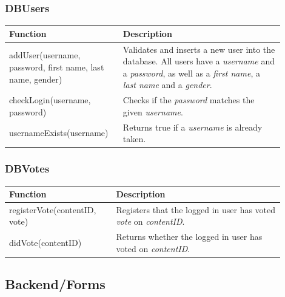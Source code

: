 \subsubsection{DBUsers}
\begin{minipage}{\linewidth}
  \centering
  \setlength{\tabcolsep}{12pt}
  \begin{tabular}{|p{0.35\linewidth}|p{0.55\linewidth}|}
  \hline
  \cellcolor{gray!25} Function & \cellcolor{gray!25} Description \\
  \hline
  addUser(username, password, first name, last name, gender) & Validates and inserts a new user into the database. All users have a \textit{username} and a \textit{password}, as well as a \textit{first name}, a \textit{last name} and a \textit{gender}. \\
  checkLogin(username, password) & Checks if the \textit{password} matches the given \textit{username}. \\
  usernameExists(username) & Returns true if a \textit{username} is already taken. \\
  \hline  
  \end{tabular}
\end{minipage}

\subsubsection{DBVotes}
\begin{minipage}{\linewidth}
  \centering
  \setlength{\tabcolsep}{12pt}
  \begin{tabular}{|p{0.35\linewidth}|p{0.55\linewidth}|}
  \hline
  \cellcolor{gray!25} Function & \cellcolor{gray!25} Description \\
  \hline
  registerVote(contentID, vote) & Registers that the logged in user has voted \textit{vote} on \textit{contentID}. \\
  didVote(contentID) & Returns whether the logged in user has voted on \textit{contentID}. \\
  \hline  
  \end{tabular}
\end{minipage}

\subsection{Backend/Forms}
\label{subsec:CodeDetailsBackendForms}

